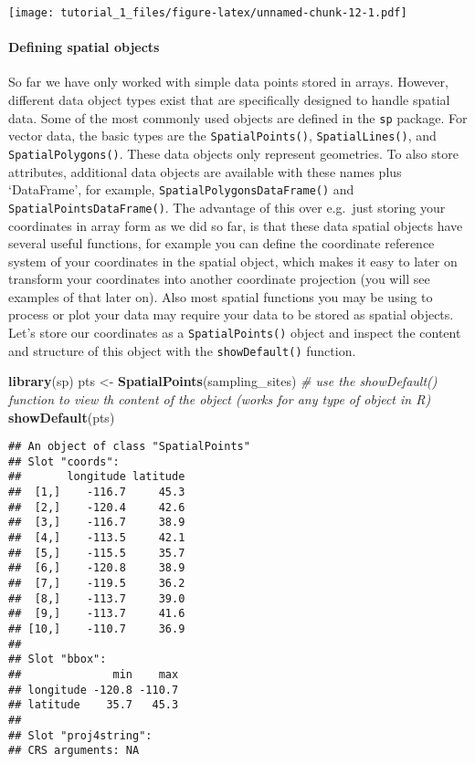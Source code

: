 \documentclass[]{article}
\newenvironment{Shaded}{\begin{snugshade}}{\end{snugshade}}
\newcommand{\CommentTok}[1]{\textcolor[rgb]{0.56,0.35,0.01}{\textit{#1}}}
\newcommand{\KeywordTok}[1]{\textcolor[rgb]{0.13,0.29,0.53}{\textbf{#1}}}
\newcommand{\NormalTok}[1]{#1}
\newcommand{\StringTok}[1]{\textcolor[rgb]{0.31,0.60,0.02}{#1}}
\let\oldparagraph\paragraph
\renewcommand{\paragraph}[1]{\oldparagraph{#1}\mbox{}}
\begin{document}
\texttt{[image: tutorial\_1\_files/figure-latex/unnamed-chunk-12-1.pdf]}

\hypertarget{defining-spatial-objects}{%
\paragraph{Defining spatial objects}\label{defining-spatial-objects}}

So far we have only worked with simple data points stored in arrays.
However, different data object types exist that are specifically
designed to handle spatial data. Some of the most commonly used objects
are defined in the \texttt{sp} package. For vector data, the basic types
are the \texttt{SpatialPoints()}, \texttt{SpatialLines()}, and
\texttt{SpatialPolygons()}. These data objects only represent
geometries. To also store attributes, additional data objects are
available with these names plus `DataFrame', for example,
\texttt{SpatialPolygonsDataFrame()} and
\texttt{SpatialPointsDataFrame()}. The advantage of this over e.g.~just
storing your coordinates in array form as we did so far, is that these
data spatial objects have several useful functions, for example you can
define the coordinate reference system of your coordinates in the
spatial object, which makes it easy to later on transform your
coordinates into another coordinate projection (you will see examples of
that later on). Also most spatial functions you may be using to process
or plot your data may require your data to be stored as spatial objects.
Let's store our coordinates as a \texttt{SpatialPoints()} object and
inspect the content and structure of this object with the
\texttt{showDefault()} function.

\begin{Shaded}
\begin{Highlighting}[]
\KeywordTok{library}\NormalTok{(sp)}
\NormalTok{pts <-}\StringTok{ }\KeywordTok{SpatialPoints}\NormalTok{(sampling_sites)}
\CommentTok{# use the showDefault() function to view th content of the object (works for any type of object in R)}
\KeywordTok{showDefault}\NormalTok{(pts)}
\end{Highlighting}
\end{Shaded}

\begin{verbatim}
## An object of class "SpatialPoints"
## Slot "coords":
##       longitude latitude
##  [1,]    -116.7     45.3
##  [2,]    -120.4     42.6
##  [3,]    -116.7     38.9
##  [4,]    -113.5     42.1
##  [5,]    -115.5     35.7
##  [6,]    -120.8     38.9
##  [7,]    -119.5     36.2
##  [8,]    -113.7     39.0
##  [9,]    -113.7     41.6
## [10,]    -110.7     36.9
## 
## Slot "bbox":
##              min    max
## longitude -120.8 -110.7
## latitude    35.7   45.3
## 
## Slot "proj4string":
## CRS arguments: NA
\end{verbatim}
\end{document}
